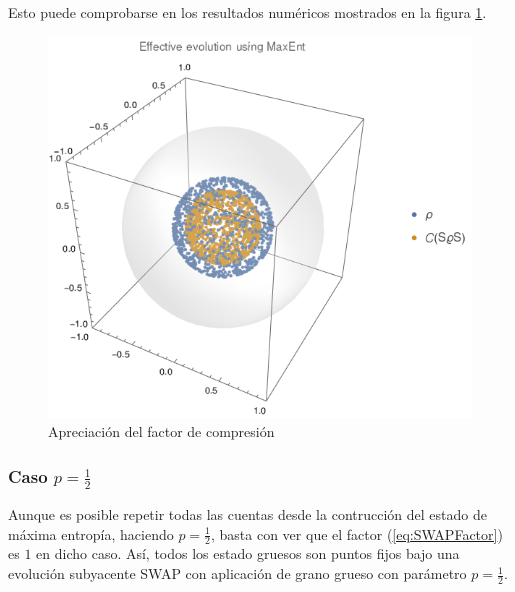 Esto puede comprobarse en los resultados numéricos mostrados en la figura \ref{fig:factornnum}.
\begin{figure}[h!]
\centering
\includegraphics[width=0.6\linewidth]{maxent/figures/MaxEnt_SWAP_t0vst1_n=5000_z=0.5_p=0.3_beta=150_delta=0.6.png}
\caption{Apreciación del factor de compresión }
\label{fig:factornnum}
\end{figure}

\subsubsection{Caso $p=\frac{1}{2}$}

Aunque es posible repetir todas las cuentas desde la contrucción del estado de máxima entropía, haciendo $p=\frac{1}{2}$, basta con ver que el factor (\eqref{eq:SWAPFactor}) es $1$ en dicho caso. Así, todos los estado gruesos son puntos fijos bajo una evolución subyacente SWAP con aplicación de grano grueso con parámetro $p=\frac{1}{2}$.

